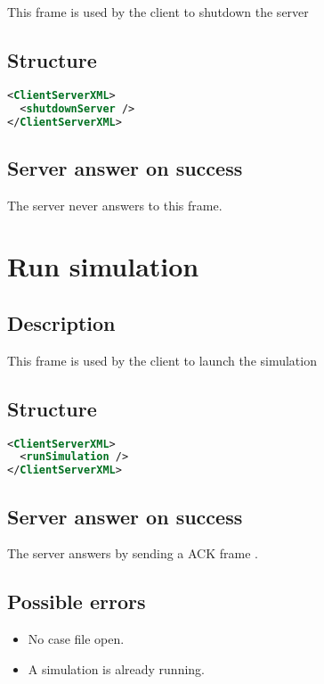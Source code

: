 This frame is used by the client to shutdown the server

\subsection{Structure}

\begin{lstlisting}[language=XML]
<ClientServerXML>
  <shutdownServer />
</ClientServerXML>
\end{lstlisting}

\subsection{Server answer on success}

The server never answers to this frame.


\section{Run simulation}
\label{runSimulation}

\subsection{Description}

This frame is used by the client to launch the simulation

\subsection{Structure}

\begin{lstlisting}[language=XML]
<ClientServerXML>
  <runSimulation />
</ClientServerXML>
\end{lstlisting}

\subsection{Server answer on success}

The server answers by sending a ACK frame .

\subsection{Possible errors}

\begin{itemize}
 \item No case file open.
 \item A simulation is already running.
\end{itemize}
